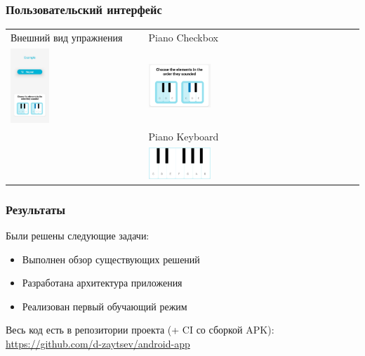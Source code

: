 \documentclass{beamer}
\begin{document}
\begin{frame}
  \frametitle{Пользовательский интерфейс}
  \begin{tabular}{p{6cm} p{7cm}}
  Внешний вид упражнения & \hspace{13pt}Piano Checkbox \\
  \hspace{10pt}
  \includegraphics[width=0.3\textwidth]{../images/example3-eps-converted-to.pdf}&
  \vspace{-200pt}
  \includegraphics[width=0.3\textwidth]{../images/example1-eps-converted-to.pdf}\\
  &
  \vspace{-105pt}
  \hspace{15pt}Piano Keyboard\\&
  \vspace{-105pt}
  \includegraphics[width=0.3\textwidth]{../images/example4-eps-converted-to.pdf}
 \end{tabular}
\end{frame}

\begin{frame}
  \frametitle{Результаты}
  Были решены следующие задачи:
  \begin{itemize}
    \item Выполнен обзор существующих решений
    \item Разработана архитектура приложения
    \item Реализован первый обучающий режим
  \end{itemize}
\vspace{30pt}
Весь код есть в репозитории проекта (+ CI со сборкой APK): \url{https://github.com/d-zaytsev/android-app}
\end{frame}
\end{document}
